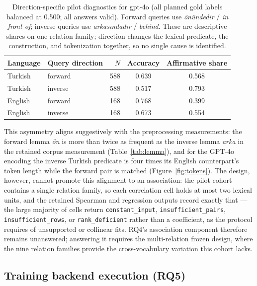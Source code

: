 \begin{table}[t]
  \centering
  \caption{Direction-specific pilot diagnostics for gpt-4o (all planned gold labels balanced at 0.500;
  all answers valid). Forward queries use \emph{önündedir} / \emph{in front of}; inverse queries use
  \emph{arkasındadır} / \emph{behind}. These are descriptive shares on one relation family; direction
  changes the lexical predicate, the construction, and tokenization together, so no single cause is
  identified.}
  \label{tab:direction}
  \small
  \begin{tabular}{@{}llrcc@{}}
    \toprule
    Language & Query direction & $N$ & Accuracy & Affirmative share \\
    \midrule
    Turkish & forward & 588 & 0.639 & 0.568 \\
    Turkish & inverse & 588 & 0.517 & 0.793 \\
    English & forward & 168 & 0.768 & 0.399 \\
    English & inverse & 168 & 0.673 & 0.554 \\
    \bottomrule
  \end{tabular}
\end{table}

This asymmetry aligns suggestively with the preprocessing measurements: the forward lemma \emph{ön} is
more than twice as frequent as the inverse lemma \emph{arka} in the retained corpus measurement
(Table~\ref{tab:lemma}), and for the GPT-4o encoding the inverse Turkish predicate is four times its
English counterpart's token length while the forward pair is matched (Figure~\ref{fig:tokens}). The
design, however, cannot promote this alignment to an association: the pilot cohort contains a single
relation family, so each correlation cell holds at most two lexical units, and the retained Spearman and
regression outputs record exactly that --- the large majority of cells return \texttt{constant\_input},
\texttt{insufficient\_pairs}, \texttt{insufficient\_rows}, or \texttt{rank\_deficient} rather than a
coefficient, as the protocol requires of unsupported or collinear fits. RQ4's association component
therefore remains unanswered; answering it requires the multi-relation frozen design, where the nine
relation families provide the cross-vocabulary variation this cohort lacks.

\subsection{Training backend execution (RQ5)}

